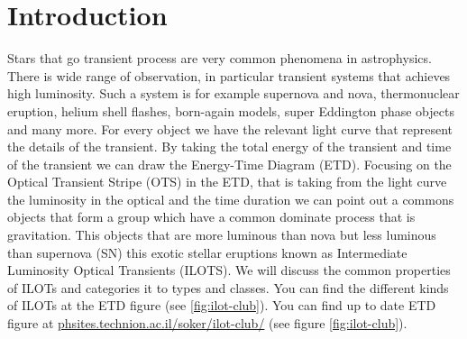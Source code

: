 \documentclass[a4paper,12pt,modern]{aastex62}
\begin{document}
\section{Introduction}
Stars that go transient process are very common phenomena in astrophysics. There is wide range of observation, in particular transient systems that achieves high luminosity. Such a system is for example supernova and nova, thermonuclear eruption, helium shell flashes, born-again models, super Eddington phase objects and many more.
For every object we have the relevant light curve that represent the details of the transient. By taking the total energy of the transient and time of the transient we can draw the Energy-Time Diagram (ETD). Focusing on the Optical Transient Stripe (OTS) in the ETD, that is taking from the light curve the luminosity in the optical and the time duration we can point out a commons objects that form a group which have a common dominate process that is gravitation. This objects that are more luminous than nova but less luminous than supernova (SN) this exotic stellar eruptions known as Intermediate Luminosity Optical Transients (ILOTS). We will discuss the common properties of ILOTs and categories it to types and classes. You can find the different kinds of ILOTs at the ETD figure (see \ref{fig:ilot-club}). You can find up to date ETD figure at \url{phsites.technion.ac.il/soker/ilot-club/} (see figure \ref{fig:ilot-club}). 
\end{document}
